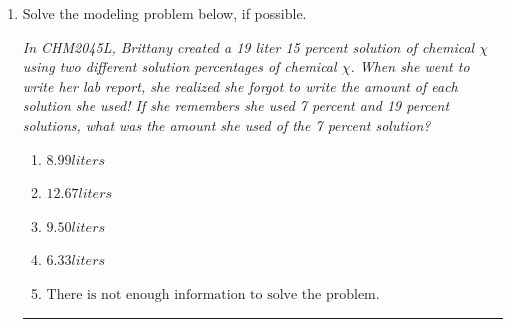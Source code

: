 \documentclass[14pt]{extbook}
\newcommand{\litem}[1]{\item#1\hspace*{-1cm}\rule{\textwidth}{0.4pt}}
\begin{document}
\begin{enumerate}
{\begin{enumerate}[label=\Alph*.]
\end{enumerate} }
\litem{
Solve the modeling problem below, if possible.
\begin{center}
    \textit{ In CHM2045L, Brittany created a 19 liter 15 percent solution of chemical $\chi$ using two different solution percentages of chemical $\chi$. When she went to write her lab report, she realized she forgot to write the amount of each solution she used! If she remembers she used 7 percent and 19 percent solutions, what was the amount she used of the 7 percent solution? }
\end{center}
\begin{enumerate}[label=\Alph*.]
\item \( 8.99 liters \)
\item \( 12.67 liters \)
\item \( 9.50 liters \)
\item \( 6.33 liters \)
\item \( \text{There is not enough information to solve the problem.} \)

\end{enumerate} }
\end{enumerate}
\end{document}
